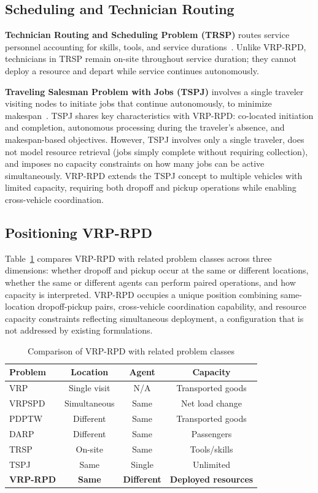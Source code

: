 \documentclass{article}
\begin{document}
\subsection{Scheduling and Technician Routing}

\textbf{Technician Routing and Scheduling Problem (TRSP)} routes service personnel accounting for skills, tools, and service durations~\cite{kovacs2012adaptive, pillac2013technician}. Unlike VRP-RPD, technicians in TRSP remain on-site throughout service duration; they cannot deploy a resource and depart while service continues autonomously.

\textbf{Traveling Salesman Problem with Jobs (TSPJ)} involves a single traveler visiting nodes to initiate jobs that continue autonomously, to minimize makespan~\cite{mosayebi2021traveling}. TSPJ shares key characteristics with VRP-RPD: co-located initiation and completion, autonomous processing during the traveler's absence, and makespan-based objectives. However, TSPJ involves only a single traveler, does not model resource retrieval (jobs simply complete without requiring collection), and imposes no capacity constraints on how many jobs can be active simultaneously. VRP-RPD extends the TSPJ concept to multiple vehicles with limited capacity, requiring both dropoff and pickup operations while enabling cross-vehicle coordination.

\subsection{Positioning VRP-RPD}

Table~\ref{tab:comparison} compares VRP-RPD with related problem classes across three dimensions: whether dropoff and pickup occur at the same or different locations, whether the same or different agents can perform paired operations, and how capacity is interpreted. VRP-RPD occupies a unique position combining same-location dropoff-pickup pairs, cross-vehicle coordination capability, and resource capacity constraints reflecting simultaneous deployment, a configuration that is not addressed by existing formulations.

\begin{table}[t]
\centering
\caption{Comparison of VRP-RPD with related problem classes}
\label{tab:comparison}
\small
\begin{tabular}{lccc}
\toprule
Problem & Location & Agent & Capacity \\
\midrule
VRP & Single visit & N/A & Transported goods \\
VRPSPD & Simultaneous & Same & Net load change \\
PDPTW & Different & Same & Transported goods \\
DARP & Different & Same & Passengers \\
TRSP & On-site & Same & Tools/skills \\
TSPJ & Same & Single & Unlimited \\
\textbf{VRP-RPD} & \textbf{Same} & \textbf{Different} & \textbf{Deployed resources} \\
\bottomrule
\end{tabular}
\end{table}
\end{document}
